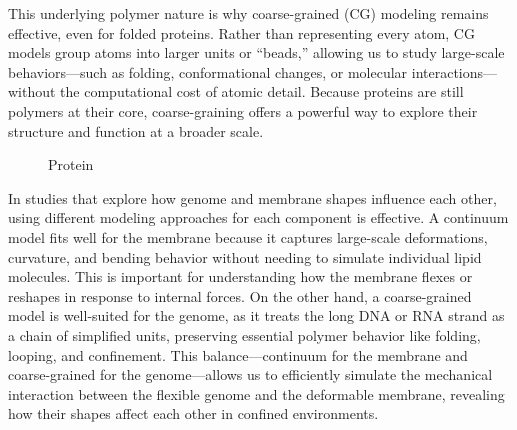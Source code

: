 \documentclass[12pt]{article}
\begin{document}
\begin{flushleft}
This underlying polymer nature is why coarse-grained (CG) modeling remains effective, even for folded proteins. Rather than representing every atom, CG models group atoms into larger units or “beads,” allowing us to study large-scale behaviors—such as folding, conformational changes, or molecular interactions—without the computational cost of atomic detail. Because proteins are still polymers at their core, coarse-graining offers a powerful way to explore their structure and function at a broader scale.


\begin{figure}[!ht]
  \centering
  
  \caption{Protein}
\end{figure}





In studies that explore how genome and membrane shapes influence each other, using different modeling approaches for each component is effective. A continuum model fits well for the membrane because it captures large-scale deformations, curvature, and bending behavior without needing to simulate individual lipid molecules. This is important for understanding how the membrane flexes or reshapes in response to internal forces. On the other hand, a coarse-grained model is well-suited for the genome, as it treats the long DNA or RNA strand as a chain of simplified units, preserving essential polymer behavior like folding, looping, and confinement. This balance—continuum for the membrane and coarse-grained for the genome—allows us to efficiently simulate the mechanical interaction between the flexible genome and the deformable membrane, revealing how their shapes affect each other in confined environments.

\end{flushleft}
\end{document}
